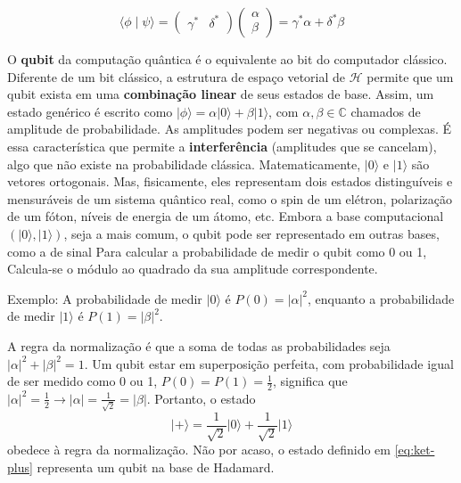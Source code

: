 \documentclass[12pt, a4paper]{article}
\newcommand{\ket}[1]{\lvert #1 \rangle}
\newcommand{\braket}[2]{\langle #1 \mid #2 \rangle}
\begin{document}
\[
\braket{\phi}{\psi} = 
\begin{pmatrix}
   \gamma^* & \delta^*
\end{pmatrix}
\begin{pmatrix}
    \alpha \\
    \beta
\end{pmatrix} =
\gamma^*\alpha + \delta^*\beta
\]

O \textbf{qubit} da computação quântica é o equivalente ao bit do computador clássico. Diferente de um bit clássico, a estrutura de espaço vetorial de $\mathcal{H}$ permite que um qubit exista em uma \textbf{combinação linear} de seus estados de base. Assim, um estado genérico é escrito como $\ket{\phi} = \alpha\ket{0} + \beta\ket{1}$, com $\alpha, \beta\in \mathbb{C}$ chamados de amplitude de probabilidade. As amplitudes podem ser negativas ou complexas. É essa característica que permite a \textbf{interferência} (amplitudes que se cancelam), algo que não existe na probabilidade clássica. Matematicamente, $\ket{0}$ e $\ket{1}$ são vetores ortogonais. Mas, fisicamente, eles representam dois estados distinguíveis e mensuráveis de um sistema quântico real, como o spin de um elétron, polarização de um fóton, níveis de energia de um átomo, etc. Embora a base computacional $(\ket{0}, \ket{1})$, seja a mais comum, o qubit pode ser representado em outras bases, como a de sinal   Para calcular a probabilidade de medir o qubit como 0 ou 1, Calcula-se o módulo ao quadrado da sua amplitude correspondente.


Exemplo: A probabilidade de medir $\ket{0}$ é $P(0) = |\alpha|^2$, enquanto a probabilidade de medir $\ket{1}$ é $P(1) = |\beta|^2$.

A regra da normalização é que a soma de todas as probabilidades seja \(|\alpha|^2 + |\beta|^2 = 1\). Um qubit estar em superposição perfeita, com probabilidade igual de ser medido como 0 ou 1, \(P(0) = P(1) = \frac{1}{2}\), significa que \(|\alpha|^2 = \frac{1}{2} \longrightarrow{|\alpha| = \frac{1}{\sqrt{2}} = |\beta|}\). Portanto, o estado
\begin{equation}
    \ket{+} = 
    \frac{1}{\sqrt{2}}\ket{0} + 
    \frac{1}{\sqrt{2}}\ket{1}
    \label{eq:ket-plus}
\end{equation}
obedece à regra da normalização. Não por acaso, o estado definido em \eqref{eq:ket-plus} representa um qubit na base de Hadamard.
\end{document}
